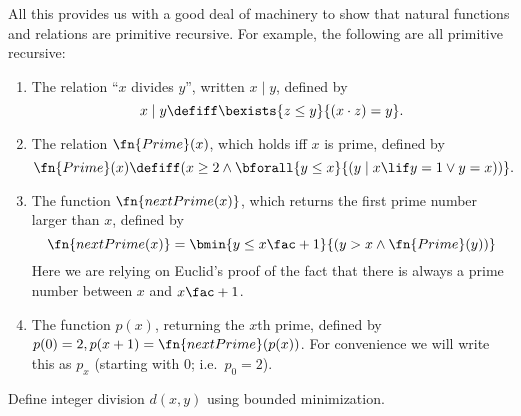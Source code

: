 \documentclass[../../../include/open-logic-section]{subfiles}
\begin{document}
All this provides us with a good deal of machinery to show that
natural functions and relations are primitive recursive. For example,
the following are all primitive recursive:
\begin{enumerate}
\item The relation ``$x$ divides $y$'', written $x \mid y$, defined by
\[
x \mid y \defiff \bexists{z \leq y}{(x \cdot z) = y}.
\]

\item The relation $\fn{Prime}(x)$, which holds iff $x$ is prime,
  defined by
\[
\fn{Prime}(x) \defiff (x \geq 2 \land \bforall{y \leq x}{(y \mid x \lif y
  = 1 \lor y = x))}.
\]
\item The function $\fn{nextPrime(x)}$, which returns the first prime
  number larger than $x$, defined by
\[
  \fn{nextPrime(x)} =
  \bmin{y \leq x\fac+1}{(y > x \land \fn{Prime}(y))}
\]
Here we are relying on Euclid's proof of the fact that there is always
a prime number between $x$ and $x\fac+1$.

\item The function $p(x)$, returning the $x$th prime, defined by $p(0)
  = 2, p(x+1) = \fn{nextPrime}(p(x))$. For convenience we will write
  this as $p_x$ (starting with 0; i.e.\ $p_0=2$).
\end{enumerate}

\begin{prob}
Define integer division $d(x, y)$ using bounded minimization.
\end{prob}
\end{document}
